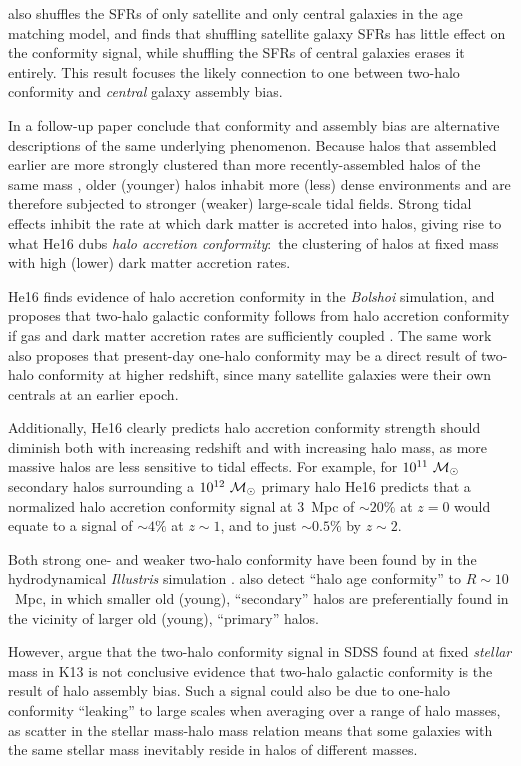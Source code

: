 \citet{Hearin15} also shuffles the SFRs of only satellite and only central galaxies in the age matching model, and finds that shuffling satellite galaxy SFRs has little effect on the conformity signal, while shuffling the SFRs of central galaxies erases it entirely.
This result focuses the likely connection to one between two-halo conformity and \emph{central} galaxy assembly bias.

In a follow-up paper \citet*[][hereafter He16]{Hearin16} conclude that conformity and assembly bias are alternative descriptions of the same underlying phenomenon.
Because halos that assembled earlier are more strongly clustered than more recently-assembled halos of the same mass \citep[e.g.,][]{Hahn09}, older (younger) halos inhabit more (less) dense environments and are therefore subjected to stronger (weaker) large-scale tidal fields.
Strong tidal effects inhibit the rate at which dark matter is accreted into halos, giving rise to what He16 dubs \emph{halo accretion conformity}:~the clustering of halos at fixed mass with high (lower) dark matter accretion rates.

He16 finds evidence of halo accretion conformity in the \emph{Bolshoi} simulation, and proposes that two-halo galactic conformity follows from halo accretion conformity if gas and dark matter accretion rates are sufficiently coupled \citep[e.g.,][]{WetzelNagai15}.
The same work also proposes that present-day one-halo conformity may be a direct result of two-halo conformity at higher redshift, since many satellite galaxies were their own centrals at an earlier epoch.

Additionally, He16 clearly predicts halo accretion conformity strength should diminish both with increasing redshift and with increasing halo mass, as more massive halos are less sensitive to tidal effects.
For example, for $10^{11}~\msun$ secondary halos surrounding a $10^{12}~\msun$ primary halo He16 predicts that a normalized halo accretion conformity signal at 3~Mpc of $\sim20\%$ at $z=0$ would equate to a signal of $\sim4\%$ at $z\sim1$, and to just $\sim0.5\%$ by $z\sim2$.

Both strong one- and weaker two-halo conformity have been found by \citet{Bray16a} in the hydrodynamical \emph{Illustris} simulation \citep{Vogelsberger14}.
\citet{Bray16a} also detect ``halo age conformity'' to $R\sim10$~Mpc, in which smaller old (young), ``secondary'' halos are preferentially found in the vicinity of larger old (young), ``primary'' halos.

However, \citet{Paranjape15} argue that the two-halo conformity signal in SDSS found at fixed \emph{stellar} mass in K13 is not conclusive evidence that two-halo galactic conformity is the result of halo assembly bias.
Such a signal could also be due to one-halo conformity ``leaking'' to large scales when averaging over a range of halo masses, as scatter in the stellar mass-halo mass relation means that some galaxies with the same stellar mass inevitably reside in halos of different masses.

